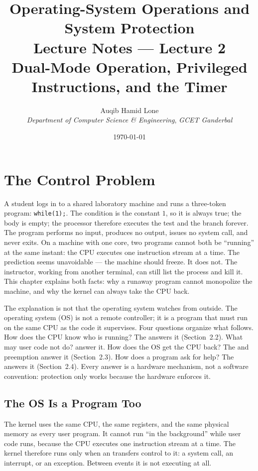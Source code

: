\documentclass[11pt]{article}
\title{Operating-System Operations and System Protection\\\large Lecture Notes --- Lecture 2\\
  \normalsize Dual-Mode Operation, Privileged Instructions, and the Timer}
\author{Auqib Hamid Lone\\[0.3em]
  \emph{Department of Computer Science \& Engineering}, \emph{GCET Ganderbal}}
\date{\today}
\begin{document}
\maketitle

\section{The Control Problem}
\noindent{}

A student logs in to a shared laboratory machine and runs a three-token
program: \texttt{while(1);}. The condition is the constant $1$, so it is always
true; the body is empty; the processor therefore executes the test and the
branch forever. The program performs no input, produces no output, issues no
system call, and never exits. On a machine with one core, two programs cannot
both be ``running'' at the same instant: the CPU executes one instruction
stream at a time. The prediction seems unavoidable --- the machine should
freeze. It does not. The instructor, working from another terminal, can still
list the process and kill it. This chapter explains both facts: why a runaway
program cannot monopolize the machine, and why the kernel can always take the
CPU back.

The explanation is not that the operating system watches from outside. The
operating system (OS) is not a remote controller; it is a program that must run
on the same CPU as the code it supervises. Four questions organize what
follows. How does the CPU know who is running? The  answers it
(Section~2.2). What may user code not do?  answer
it. How does the OS get the CPU back? The  and preemption answer it
(Section~2.3). How does a program ask for help? The 
answers it (Section~2.4). Every answer is a hardware mechanism, not a software
convention: protection only works because the hardware enforces it.

\subsection{The OS Is a Program Too}

The kernel uses the same CPU, the same registers, and the same physical memory
as every user program. It cannot run ``in the background'' while user code
runs, because the CPU executes one instruction stream at a time. The kernel
therefore runs only when an  transfers control to it: a system call,
an interrupt, or an exception. Between events it is not executing at all.
\end{document}
